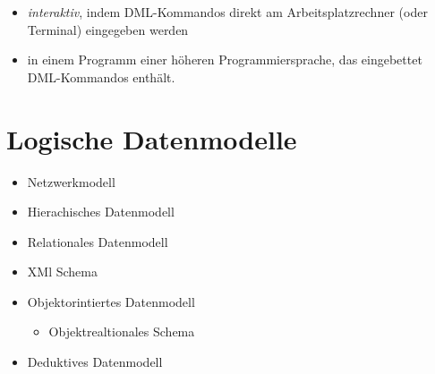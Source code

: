 \begin{itemize}
\item \textit{interaktiv}, indem DML-Kommandos direkt am Arbeitsplatzrechner (oder Terminal) eingegeben werden
\item in einem Programm einer höheren Programmiersprache, das \glqq eingebettet \grqq DML-Kommandos enthält.
\end{itemize}

\section{Logische Datenmodelle}
\begin{itemize}
\item Netzwerkmodell
\item Hierachisches Datenmodell
\item Relationales Datenmodell
\item XMl Schema
\item Objektorintiertes Datenmodell
\begin{itemize}
\item Objektrealtionales Schema
\end{itemize}
\item Deduktives Datenmodell
\end{itemize}
